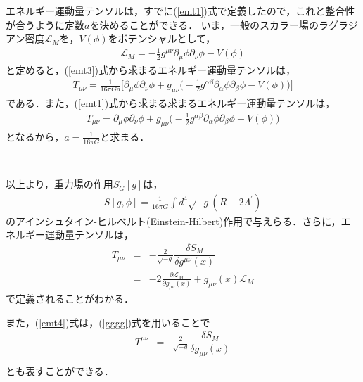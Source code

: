 エネルギー運動量テンソルは，すでに(\ref{emt1})式で定義したので，これと整合性が合うように定数$a$を決めることができる．
いま，一般のスカラー場のラグラジアン密度$\mathcal{L}_{M}$を，$V(\phi)$をポテンシャルとして，
\begin{eqnarray}
\mathcal{L}_{M}=-\frac{1}{2}g^{\mu\nu}\partial_{\mu}\phi\partial_{\nu}\phi-V(\phi)
\end{eqnarray}
と定めると，(\ref{emt3})式から求まるエネルギー運動量テンソルは，
\begin{eqnarray}
T_{\mu\nu}=\frac{1}{16\pi Ga}\biggl[\partial_{\mu}\phi\partial_{\nu}\phi+g_{\mu\nu}\biggl(-\frac{1}{2}g^{\alpha\beta}\partial_{\alpha}\phi\partial_{\beta}\phi-V(\phi)\biggr)\biggr]
\end{eqnarray}
である．また，(\ref{emt1})式から求まる求まるエネルギー運動量テンソルは，
\begin{eqnarray}
T_{\mu\nu}=\partial_{\mu}\phi\partial_{\nu}\phi+g_{\mu\nu}\biggl(-\frac{1}{2}g^{\alpha\beta}\partial_{\alpha}\phi\partial_{\beta}\phi-V(\phi)\biggr)
\end{eqnarray}
となるから，$a=\frac{1}{16\pi G}$と求まる．
\begin{empheqboxed}
\

以上より，重力場の作用$S_{G}[g]$は，
\begin{eqnarray}
S[g,\phi]=\frac{1}{16\pi G}\int d^4\sqrt{-g}(R-2\Lambda^{\prime})
\end{eqnarray}
のアインシュタイン-ヒルベルト(Einstein-Hilbert)作用で与えらる．さらに，エネルギー運動量テンソルは，
\begin{eqnarray}
\label{emt4}
T_{\mu\nu}&=&-\frac{2}{\sqrt{-g}}\dfrac{\delta S_{M}}{\delta g^{\mu\nu}(x)} \nonumber \\
&=&-2\frac{\partial \mathcal{L}_{M}}{\partial g_{\mu\nu}(x)}+g_{\mu\nu}(x)\mathcal{L}_{M}
\end{eqnarray}
で定義されることがわかる．

\end{empheqboxed}
また，(\ref{emt4})式は，(\ref{gggg})式を用いることで
\begin{eqnarray}
\label{emt5}
T^{\mu\nu}&=&\frac{2}{\sqrt{-g}}\dfrac{\delta S_{M}}{\delta g_{\mu\nu}(x)} \nonumber \\
\end{eqnarray}
とも表すことができる．

